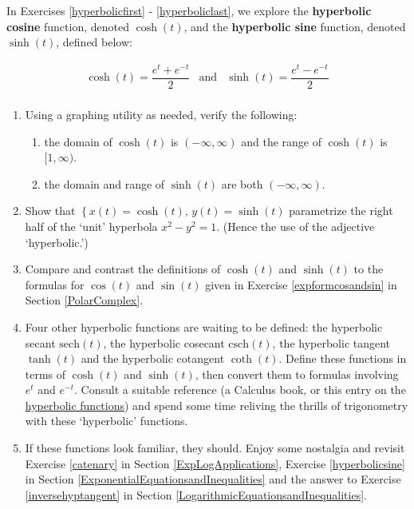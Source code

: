 \label{hyperboliccosinesine} 

In Exercises \ref{hyperbolicfirst} - \ref{hyperboliclast}, we explore the  \textbf{hyperbolic cosine} function, denoted $\cosh(t)$, and the \textbf{hyperbolic sine}
function, denoted $\sinh(t)$, defined below:

\[ \begin{array}{ccc}

\cosh(t) = \dfrac{e^{t} + e^{-t}}{2} & 
\text{and} & \sinh(t) = \dfrac{e^{t} - e^{-t}}{2} \\

\end{array} \]

\begin{enumerate}
\setcounter{enumi}{\value{HW}}

\item  Using a graphing utility as needed, verify the following:  \label{hyperbolicfirst}

\begin{enumerate}

\item the domain of $\cosh(t)$ is $(-\infty, \infty)$ and the range of $\cosh(t)$ is $[1,\infty)$.

\item  the domain and range  of $\sinh(t)$ are both $(-\infty, \infty)$.

\end{enumerate}

\item  Show that $\left\{ x(t) = \cosh(t), \, y(t) = \sinh(t) \right.$ parametrize the right half of the `unit' hyperbola $x^2 - y^2 = 1$.  (Hence the use of the adjective `hyperbolic.')

\item  Compare and contrast the definitions of $\cosh(t)$ and $\sinh(t)$ to the formulas for $\cos(t)$ and $\sin(t)$ given in Exercise \ref{expformcosandsin} in Section \ref{PolarComplex}.

\item \label{andtheresthyperbolic} Four other hyperbolic functions are waiting to be defined:  the hyperbolic secant $\text{sech}(t)$, the hyperbolic cosecant $\text{csch}(t)$, the hyperbolic tangent $\tanh(t)$ and the hyperbolic cotangent $\coth(t)$.  Define these functions in terms of $\cosh(t)$ and $\sinh(t)$, then convert them to formulas involving $e^{t}$ and $e^{-t}$.  Consult a suitable reference (a Calculus book, or this entry on the \href{http://en.wikipedia.org/wiki/Hyperbolic_function}{\underline{hyperbolic functions}}) and spend some time reliving the thrills of trigonometry with these `hyperbolic' functions.

\item  If these functions look familiar, they should.  Enjoy some nostalgia and revisit Exercise \ref{catenary} in Section \ref{ExpLogApplications}, Exercise \ref{hyperbolicsine} in Section \ref{ExponentialEquationsandInequalities} and the  answer to Exercise \ref{inversehyptangent} in Section \ref{LogarithmicEquationsandInequalities}. \label{hyperboliclast}

\end{enumerate}

